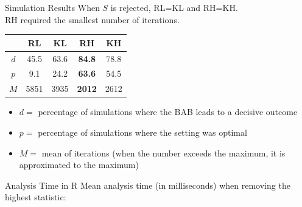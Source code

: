 \documentclass[aspectratio=169]{beamer}
\begin{document}
\begin{frame}{Simulation Results}
When $S$ is rejected, RL=KL and RH=KH.\\
RH required the smallest number of iterations.

\vspace{3mm}
\begin{table}[h!]
\centering
\begin{tabular}{ccccc}
\toprule
 & RL & KL & \textbf{RH} & KH\\
\midrule
$d$ & 45.5 & 63.6 & \textbf{84.8} & 78.8 \\ 
$p$ & 9.1 & 24.2 & \textbf{63.6} & 54.5 \\
$M$ & 5851 & 3935 & \textbf{2012} & 2612 \\
\bottomrule
\end{tabular}
\end{table}

\vspace{3mm}
\begin{itemize}
\item $d=$ percentage of simulations where the BAB leads to a decisive outcome
\item $p=$ percentage of simulations where the setting was optimal
\item $M=$ mean of iterations (when the number exceeds the maximum, it is approximated to the maximum)
\end{itemize}
\end{frame}





\begin{frame}{Analysis Time in R}
Mean analysis time (in milliseconds) when removing the highest statistic:
\begin{table}[h!]
\centering
{}
\end{table}
\end{frame}
\end{document}
